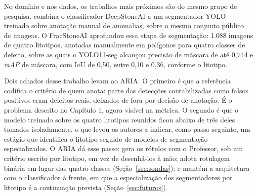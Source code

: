 No domínio e nos dados, os trabalhos mais próximos são do mesmo grupo de pesquisa.  combina o classificador DeepStoneAI \cite{deepstoneai_moreira2025} a um segmentador YOLO treinado sobre anotação manual de anomalias, sobre o mesmo conjunto público de imagens. O FracStoneAI \cite{fracstoneai_oliveira2026} aprofundou essa etapa de segmentação: 1.088 imagens de quatro litotipos, anotadas manualmente em polígonos para quatro classes de defeito, sobre as quais o YOLO11-seg alcançou precisão de máscara de até 0,744 e \textit{mAP} de máscara, com IoU de 0,50, entre 0,10 e 0,36, conforme o litotipo.

Dois achados desse trabalho levam ao ARIA. O primeiro é que a referência codifica o critério de quem anota: parte das detecções contabilizadas como falsos positivos eram defeitos reais, deixados de fora por decisão de anotação. É o problema descrito no Capítulo 1, agora visível na métrica. O segundo é que o modelo treinado sobre os quatro litotipos reunidos ficou abaixo de três deles tomados isoladamente, o que levou os autores a indicar, como passo seguinte, um estágio que identifica o litotipo seguido de modelos de segmentação especializados. O ARIA dá esse passo: gera os rótulos com o Professor, sob um critério escrito por litotipo, em vez de desenhá-los à mão; adota rotulagem binária em lugar das quatro classes (Seção~\ref{sec:sondas}); e mantém a arquitetura com o classificador à frente, em que a especialização dos segmentadores por litotipo é a continuação prevista (Seção~\ref{sec:futuros}).
